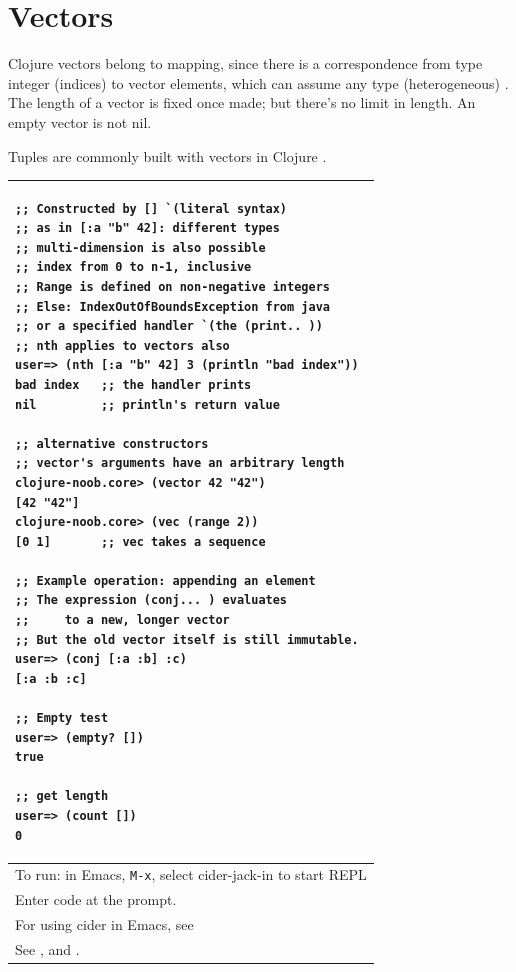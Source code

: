 \documentclass[12pt]{article}
\begin{document}
\newpage
\part{Vectors}

Clojure vectors belong to mapping, since there is a correspondence from type integer (indices) to vector elements, which can assume any type (heterogeneous) \cite{fogus2014joy}. The length of a vector is fixed once made; but there's no limit in length. An empty vector is not nil.

Tuples are commonly built with vectors in Clojure \cite{rathore2011clojure}.


\begin{tabular}{|p{}|}
\hline
\begin{verbatim}
;; Constructed by [] `(literal syntax)
;; as in [:a "b" 42]: different types
;; multi-dimension is also possible
;; index from 0 to n-1, inclusive
;; Range is defined on non-negative integers
;; Else: IndexOutOfBoundsException from java
;; or a specified handler `(the (print.. ))
;; nth applies to vectors also
user=> (nth [:a "b" 42] 3 (println "bad index"))
bad index   ;; the handler prints
nil         ;; println's return value

;; alternative constructors
;; vector's arguments have an arbitrary length
clojure-noob.core> (vector 42 "42")
[42 "42"]
clojure-noob.core> (vec (range 2))
[0 1]       ;; vec takes a sequence 

;; Example operation: appending an element
;; The expression (conj... ) evaluates 
;;     to a new, longer vector
;; But the old vector itself is still immutable.
user=> (conj [:a :b] :c)
[:a :b :c]

;; Empty test
user=> (empty? [])
true

;; get length
user=> (count [])
0
\end{verbatim}
\\
\hline
To run: in Emacs, \texttt{M-x}, select cider-jack-in to start REPL\\
Enter code at the prompt.\\
For using cider in Emacs, see \cite{brave2015}\\
\hline
See \cite{fogus2014joy}, \cite{rathore2011clojure} and \cite{empty}.\\
\hline
\end{tabular}



\newpage
\end{document}

